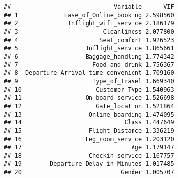 \documentclass[
]{article}
\newenvironment{Shaded}{\begin{snugshade}}{\end{snugshade}}
\newcommand{\AttributeTok}[1]{\textcolor[rgb]{0.13,0.29,0.53}{#1}}
\newcommand{\CommentTok}[1]{\textcolor[rgb]{0.56,0.35,0.01}{\textit{#1}}}
\newcommand{\ConstantTok}[1]{\textcolor[rgb]{0.56,0.35,0.01}{#1}}
\newcommand{\FunctionTok}[1]{\textcolor[rgb]{0.13,0.29,0.53}{\textbf{#1}}}
\newcommand{\NormalTok}[1]{#1}
\newcommand{\OtherTok}[1]{\textcolor[rgb]{0.56,0.35,0.01}{#1}}
\newcommand{\SpecialCharTok}[1]{\textcolor[rgb]{0.81,0.36,0.00}{\textbf{#1}}}
\newcommand{\StringTok}[1]{\textcolor[rgb]{0.31,0.60,0.02}{#1}}
\begin{document}
\begin{Shaded}
\end{Shaded}

\begin{verbatim}
##                             Variable      VIF
## 1             Ease_of_Online_booking 2.598560
## 2              Inflight_wifi_service 2.186179
## 3                        Cleanliness 2.077800
## 4                       Seat_comfort 1.926523
## 5                   Inflight_service 1.865661
## 6                   Baggage_handling 1.774342
## 7                     Food_and_drink 1.756367
## 8  Departure_Arrival_time_convenient 1.709160
## 9                     Type_of_Travel 1.669340
## 10                     Customer_Type 1.540963
## 11                  On_board_service 1.526698
## 12                     Gate_location 1.521864
## 13                   Online_boarding 1.474095
## 14                             Class 1.447649
## 15                   Flight_Distance 1.336219
## 16                  Leg_room_service 1.203120
## 17                               Age 1.179147
## 18                   Checkin_service 1.167757
## 19        Departure_Delay_in_Minutes 1.017485
## 20                            Gender 1.005707
\end{verbatim}
\end{document}
